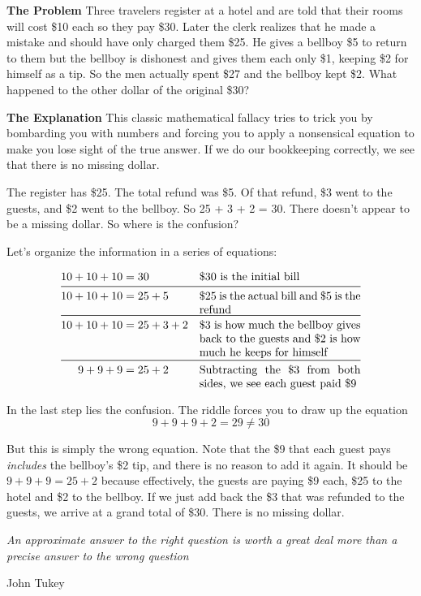 
\noindent
\textbf{The Problem}
Three travelers register at a hotel and are told that their rooms will cost \$10 each so they pay \$30. Later the clerk realizes that he made a mistake and should have only charged them \$25. He gives a bellboy \$5 to return to them but the bellboy is dishonest and gives them each only \$1, keeping \$2 for himself as a tip. So the men actually spent \$27 and the bellboy kept \$2. What happened to the other dollar of the original \$30?

\textbf{The Explanation}
This classic mathematical fallacy tries to trick you by bombarding you with numbers and forcing you to apply a nonsensical equation to make you lose sight of the true answer. If we do our bookkeeping correctly, we see that there is no missing dollar. 

The register has \$25. The total refund was \$5. Of that refund, \$3 went to the guests, and \$2 went to the bellboy. So 25 + 3 + 2 = 30. There doesn’t appear to be a missing dollar. So where is the confusion?

Let’s organize the information in a series of equations:

\vspace{-5mm}

\begin{align*}
    10 + 10 + 10 &= 30 && \text{\$30 is the initial bill} \\
    \midrule
    10 + 10 + 10 &= 25 + 5 && \parbox[t]{5cm}{
          \$25 is the actual bill and \$5 is the refund} \\
    \midrule
    10 + 10 + 10 &= 25 + 3 + 2 && \parbox[t]{5cm}{
          \$3 is how much the bellboy gives back to the guests and \$2 is how much he keeps for himself} \\
    \midrule
    9 + 9 + 9 &= 25 + 2 && \parbox[t]{5cm}{
            Subtracting the \$3 from both sides, we see each guest paid \$9}
\end{align*}

In the last step lies the confusion. The riddle forces you to draw up the equation
\begin{equation*}
    9 + 9 + 9 + 2 = 29 \neq 30
\end{equation*}

But this is simply the wrong equation. Note that the \$9 that each guest pays \textit{includes} the bellboy’s \$2 tip, and there is no reason to add it again. It should be $9 + 9 + 9 = 25 + 2$ because effectively, the guests are paying \$9 each, \$25 to the hotel and \$2 to the bellboy. If we just add back the \$3 that was refunded to the guests, we arrive at a grand total of \$30. There is no missing dollar.

\vspace{5mm}

\textit{An approximate answer to the right question is worth a great deal more than a precise answer to the wrong question}
\begin{flushright}
       John Tukey
\end{flushright}
